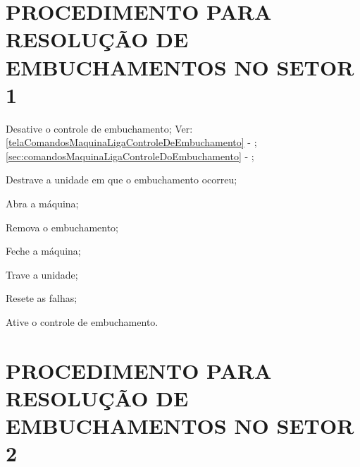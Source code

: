 \section{\large{PROCEDIMENTO PARA RESOLUÇÃO DE EMBUCHAMENTOS NO SETOR 1}}



\begin{procedureFixingIsuesSector1}

  \item[\ding{\dingNumber}] Desative o controle de embuchamento; Ver: 
  \ifmachineType
  \ref{telaComandosMaquinaLigaControleDeEmbuchamento} - ;
  \else
  \ref{sec:comandosMaquinaLigaControleDoEmbuchamento} - ;
  \fi
  \ifmachineType
  \item[\ding{\dingNumber}] Destrave a unidade em que o embuchamento ocorreu;
  \item[\ding{\dingNumber}] Abra a máquina;
  \fi
  \item[\ding{\dingNumber}] Remova o embuchamento;
  \ifmachineType
  \item[\ding{\dingNumber}] Feche a máquina;
  \item[\ding{\dingNumber}] Trave a unidade;
  \fi
  \item[\ding{\dingNumber}] Resete as falhas;
  \item[\ding{\dingNumber}] Ative o controle de embuchamento.
  
\end{procedureFixingIsuesSector1}

\section{\large{PROCEDIMENTO PARA RESOLUÇÃO DE EMBUCHAMENTOS NO SETOR 2}}



